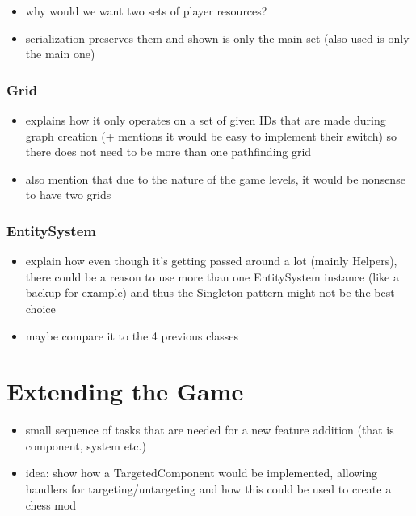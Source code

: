 \begin{itemize}
    \item why would we want two sets of player resources?
    \item serialization preserves them and shown is only the main set
        (also used is only the main one)
\end{itemize}

\subsubsection{Grid}

\begin{itemize}
    \item explains how it only operates on a set of given IDs that are
        made during graph creation (+ mentions it would be easy to implement
        their switch) so there does not need to be more than one pathfinding grid
    \item also mention that due to the nature of the game levels, it would be nonsense
        to have two grids
\end{itemize}

\subsubsection{EntitySystem}

\begin{itemize}
    \item explain how even though it's getting passed around a lot (mainly Helpers),
        there could be a reason to use more than one EntitySystem instance (like a backup
        for example) and thus the Singleton pattern might not be the best choice
    \item maybe compare it to the 4 previous classes
\end{itemize}

\section{Extending the Game}

\begin{itemize}
    \item small sequence of tasks that are needed for a new feature addition
        (that is component, system etc.)
    \item idea: show how a TargetedComponent would be implemented, allowing
        handlers for targeting/untargeting and how this could be used to create
        a chess mod
\end{itemize}
